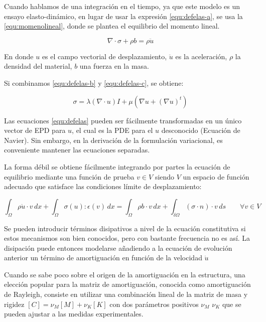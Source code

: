 \documentclass[12pt, a4paper]{article}
\begin{document}
Cuando hablamos de una integración en el tiempo, ya que este modelo es un ensayo elasto-dinámico, en lugar de usar la expresión \ref{equ:defelas-a}, se usa la \ref{equ:momenolineal}, donde se plantea el equilibrio del momento lineal.

\begin{equation}
	\nabla \cdot \sigma+ \rho b = \rho \ddot{u}
	\label{equ:momenolineal}
\end{equation}

En donde $u$ es el campo vectorial de desplazamiento, $\ddot{u}$ es la aceleración, $\rho$ la densidad del material, $b$ una fuerza en la masa.

Si combinamos \ref{equ:defelas-b} y \ref{equ:defelas-c}, se obtiene:

\begin{equation}
	\sigma = \lambda (\nabla \cdot u)I + \mu(\nabla u+(\nabla u)^t)
	\label{equ:momenolineal}
\end{equation}

Las ecuaciones \ref{equ:defelas} pueden ser fácilmente transformadas en un único vector de EPD para $u$, el cual es la PDE para el $u$ desconocido (Ecuación de Navier). Sin embargo, en la derivación de la formulación variacional, es conveniente mantener las ecuaciones separadas.

La forma débil se obtiene fácilmente integrando por partes la ecuación de equilibrio mediante una función de prueba $v \in V$ siendo $V$ un espacio de función adecuado que satisface las condiciones límite de desplazamiento:

\begin{equation}
	\int_{\Omega} \rho \ddot{u} \cdot v \,dx + \int_{\Omega} \sigma(u):\epsilon(v) \, dx = \int_{\Omega} \rho b \cdot v \, dx + \int_{\delta \Omega} (\sigma \cdot n) \cdot v \, ds \quad \quad \forall v \in V
	\label{equ:defelas-com}
\end{equation}

Se pueden introducir términos disipativos a nivel de la ecuación constitutiva si estos mecanismos son bien conocidos, pero con bastante frecuencia no es así. La disipación puede entonces modelarse añadiendo a la ecuación de evolución anterior un término de amortiguación en función de la velocidad $ \dot{u} $

Cuando se sabe poco sobre el origen de la amortiguación en la estructura, una elección popular para la matriz de amortiguación, conocida como amortiguación de Rayleigh, consiste en utilizar una combinación lineal de la matriz de masa y rigidez $[C]= \nu_M [M]+ \nu_K [K]$ con dos parámetros positivos $\nu_M$ $\nu_K$ que se pueden ajustar a las medidas experimentales.
\end{document}
